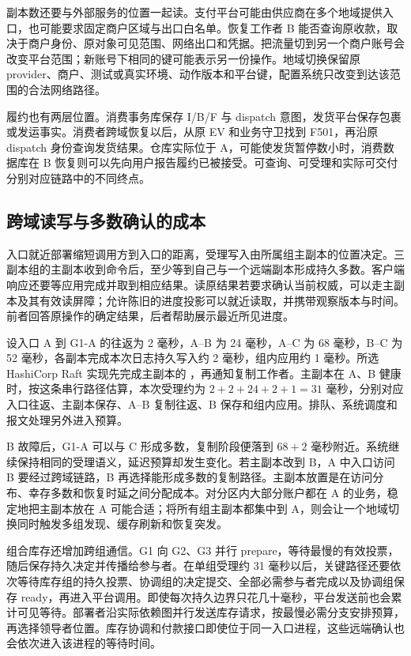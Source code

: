 副本数还要与外部服务的位置一起读。支付平台可能由供应商在多个地域提供入口，也可能要求固定商户区域与出口白名单。恢复工作者 B 能否查询原收款，取决于商户身份、原对象可见范围、网络出口和凭据。把流量切到另一个商户账号会改变平台范围；新账号下相同的键可能表示另一份操作。地域切换保留原 provider、商户、测试或真实环境、动作版本和平台键，配置系统只改变到达该范围的合法网络路径。

履约也有两层位置。消费事务库保存 I/B/F 与 dispatch 意图，发货平台保存包裹或发运事实。消费者跨域恢复以后，从原 EV 和业务守卫找到 F501，再沿原 dispatch 身份查询发货结果。仓库实际位于 A，可能使发货暂停数小时，消费数据库在 B 恢复则可以先向用户报告履约已被接受。可查询、可受理和实际可交付分别对应链路中的不同终点。

\subsection{跨域读写与多数确认的成本}

入口就近部署缩短调用方到入口的距离，受理写入由所属组主副本的位置决定。三副本组的主副本收到命令后，至少等到自己与一个远端副本形成持久多数。客户端响应还要等应用完成并取到相应结果。读原结果若要求确认当前权威，可以走主副本及其有效读屏障；允许陈旧的进度投影可以就近读取，并携带观察版本与时间。前者回答原操作的确定结果，后者帮助展示最近所见进度。

设入口 A 到 G1-A 的往返为 2 毫秒，A--B 为 24 毫秒，A--C 为 68 毫秒，B--C 为 52 毫秒，各副本完成本次日志持久写入约 2 毫秒，组内应用约 1 毫秒。所选 HashiCorp Raft 实现先完成主副本的 ，再通知复制工作者。主副本在 A、B 健康时，按这条串行路径估算，本次受理约为 $2+2+24+2+1=31$ 毫秒，分别对应入口往返、主副本保存、A--B 复制往返、B 保存和组内应用。排队、系统调度和报文处理另外进入预算。

B 故障后，G1-A 可以与 C 形成多数，复制阶段便落到 $68+2$ 毫秒附近。系统继续保持相同的受理语义，延迟预算却发生变化。若主副本改到 B，A 中入口访问 B 要经过跨域链路，B 再选择能形成多数的复制路径。主副本放置是在访问分布、幸存多数和恢复时延之间分配成本。对分区内大部分账户都在 A 的业务，稳定地把主副本放在 A 可能合适；将所有组主副本都集中到 A，则会让一个地域切换同时触发多组发现、缓存刷新和恢复突发。

组合库存还增加跨组通信。G1 向 G2、G3 并行 prepare，等待最慢的有效投票，随后保存持久决定并传播给参与者。在单组受理约 31 毫秒以后，关键路径还要依次等待库存组的持久投票、协调组的决定提交、全部必需参与者完成以及协调组保存 ready，再进入平台调用。即使每次持久边界只花几十毫秒，平台发送前也会累计可见等待。部署者沿实际依赖图并行发送库存请求，按最慢必需分支安排预算，再选择领导者位置。库存协调和付款接口即使位于同一入口进程，这些远端确认也会依次进入该进程的等待时间。

